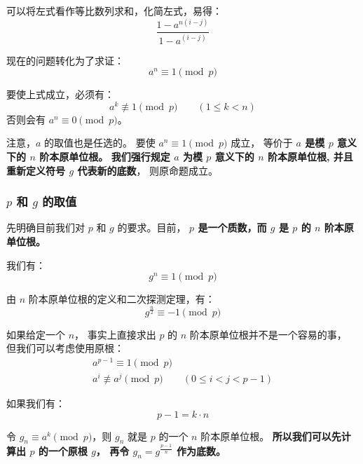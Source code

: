 \documentclass[12pt, UTF8]{article}
\begin{document}
    \bigskip
    可以将左式看作等比数列求和，化简左式，易得：
    \begin{equation*}
        \frac {1 - a^{n(i - j)}} {1 - a^{(i - j)}}
    \end{equation*}

    现在的问题转化为了求证：
    \begin{equation*}
        a^n \equiv 1 \pmod {p}
    \end{equation*}
    
    要使上式成立，必须有：
    \begin{equation*}
        a^k \not \equiv 1 \pmod {p} \qquad (1 \le k < n)
    \end{equation*}
    否则会有 $a^n \equiv 0 \pmod {p}$。

    注意，$a$ 的取值也是任选的。
    要使 $a^n \equiv 1 \pmod {p}$ 成立，
    等价于 \textbf{$a$ 是模 $p$ 意义下的 $n$ 阶本原单位根。}
    \textbf{我们强行规定 $a$ 为模 $p$ 意义下的 $n$ 阶本原单位根,
    并且重新定义符号 $g$ 代表新的底数}，
    则原命题成立。

    \subsubsection{$p$ 和 $g$ 的取值}
    先明确目前我们对 $p$ 和 $g$ 的要求。目前，
    \textbf{$p$ 是一个质数，而 $g$ 是 $p$ 的 $n$ 阶本原单位根。}

    \bigskip
    我们有：
    \begin{equation*}
        g^n \equiv 1 \pmod {p}
    \end{equation*}

    由 $n$ 阶本原单位根的定义和二次探测定理，有：
    \begin{equation*}
        g^{\frac {n} {2}} \equiv -1 \pmod {p}
    \end{equation*}

    如果给定一个 $n$，
    事实上直接求出 $p$ 的 $n$ 阶本原单位根并不是一个容易的事，
    但我们可以考虑使用原根：
    \begin{gather*}
        a^{p - 1} \equiv 1 \pmod {p}
        \\
        a^i \not \equiv a^j \pmod {p} \qquad (0 \le i < j < p - 1)
    \end{gather*}
    
    如果我们有：
    \begin{equation*}
        p - 1 = k · n
    \end{equation*}

    令 $g_n \equiv a^k \pmod {p}$，则 $g_n$ 就是 $p$ 的一个 $n$ 阶本原单位根。
    \textbf{所以我们可以先计算出 $p$ 的一个原根 $g$，
    再令 $g_n = g^{\frac {p - 1} {n}}$ 作为底数。}
\end{document}
